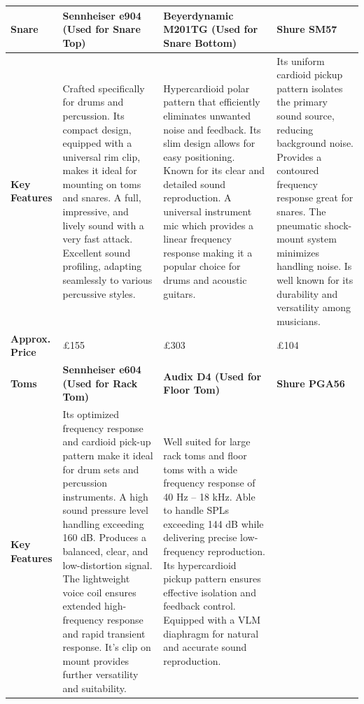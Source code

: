 \begin{longtable}[H]{|p{1.5cm}|
                >{\columncolor[HTML]{9AFF99}}p{4.8cm} |
                >{\columncolor[HTML]{9AFF99}}p{4.8cm} |
                >{\columncolor[HTML]{FFCCC9}}p{4.8cm} |}
                \textbf{Snare} &
                  \cellcolor[HTML]{9AFF99}\textbf{Sennheiser e904 (Used for Snare Top)} &
                  \cellcolor[HTML]{9AFF99}\textbf{Beyerdynamic M201TG (Used for Snare Bottom)} &
                  \cellcolor[HTML]{FFCCC9}\textbf{Shure SM57} \\ \hline
                \textbf{Key Features} &
                  \cellcolor[HTML]{9AFF99}Crafted specifically for drums and percussion. Its compact design, equipped with a universal rim clip, makes it ideal for mounting on toms and snares. A full, impressive, and lively sound with a very fast attack. Excellent sound profiling, adapting seamlessly to various percussive styles. \citep{sennheisere904} &
                  \cellcolor[HTML]{9AFF99}Hypercardioid polar pattern that efficiently eliminates unwanted noise and feedback. Its slim design allows for easy positioning. Known for its clear and detailed sound reproduction. A universal instrument mic which provides a linear frequency response making it a popular choice for drums and acoustic guitars. \citep{beyerdynamicm201tg} &
                  \cellcolor[HTML]{FFCCC9}Its uniform cardioid pickup pattern isolates the primary sound source, reducing background noise. Provides a contoured frequency response great for snares. The pneumatic shock-mount system minimizes handling noise. Is well known for its durability and versatility among musicians. \citep{shuresm57} \\ \hline
                \textbf{Approx. Price} &
                  £155 &
                  £303 &
                  £104 \\ \hline
                \textbf{Toms} &
                  \cellcolor[HTML]{9AFF99}\textbf{Sennheiser e604 (Used for Rack Tom)} &
                  \cellcolor[HTML]{9AFF99}\textbf{Audix D4 (Used for Floor Tom)} &
                  \cellcolor[HTML]{FFCCC9}\textbf{Shure PGA56} \\ \hline
                \textbf{Key Features} &
                  \cellcolor[HTML]{9AFF99}Its optimized frequency response and cardioid pick-up pattern make it ideal for drum sets and percussion instruments. A high sound pressure level handling exceeding 160 dB. Produces a balanced, clear, and low-distortion signal. The lightweight voice coil ensures extended high-frequency response and rapid transient response. It's clip on mount provides further versatility and suitability. \citep{sennheisere604} &
                  \cellcolor[HTML]{9AFF99}Well suited for large rack toms and floor toms with a wide frequency response of 40 Hz – 18 kHz. Able to handle SPLs exceeding 144 dB while delivering precise low-frequency reproduction. Its hypercardioid pickup pattern ensures effective isolation and feedback control. Equipped with a VLM diaphragm for natural and accurate sound reproduction. \citep{audixd4} &

\end{longtable}
